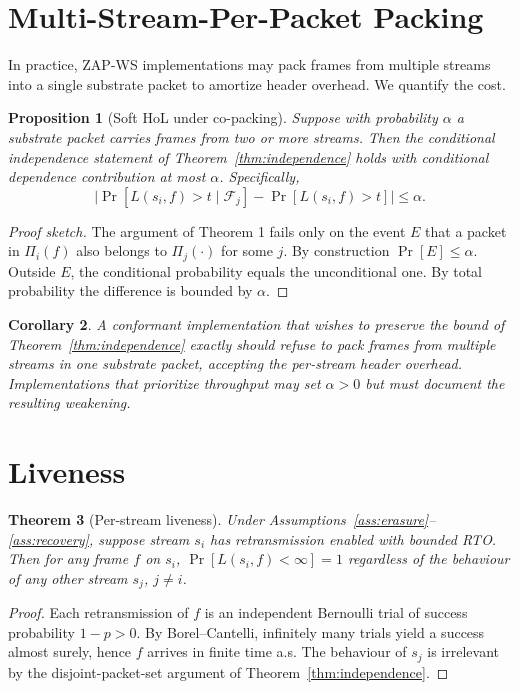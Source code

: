 \documentclass[11pt,a4paper]{article}
\newtheorem{theorem}{Theorem}
\newtheorem{corollary}[theorem]{Corollary}
\newtheorem{proposition}[theorem]{Proposition}
\begin{document}
\section{Multi-Stream-Per-Packet Packing}\label{sec:packing}

In practice, ZAP-WS implementations may pack frames from multiple
streams into a single substrate packet to amortize header overhead. We
quantify the cost.

\begin{proposition}[Soft HoL under co-packing]\label{prop:soft-hol}
Suppose with probability $\alpha$ a substrate packet carries frames from
two or more streams. Then the conditional independence statement of
Theorem~\ref{thm:independence} holds with conditional dependence
contribution at most $\alpha$. Specifically,
\[
\bigl| \Pr[L(s_i, f) > t \mid \mathcal{F}_j]
- \Pr[L(s_i, f) > t] \bigr| \le \alpha.
\]
\end{proposition}

\begin{proof}[Proof sketch]
The argument of Theorem 1 fails only on the event $E$ that a packet in
$\Pi_i(f)$ also belongs to $\Pi_j(\cdot)$ for some $j$. By construction
$\Pr[E] \le \alpha$. Outside $E$, the conditional probability equals
the unconditional one. By total probability the difference is bounded
by $\alpha$.
\end{proof}

\begin{corollary}
A conformant implementation that wishes to preserve the bound of
Theorem~\ref{thm:independence} exactly should refuse to pack frames from
multiple streams in one substrate packet, accepting the per-stream
header overhead. Implementations that prioritize throughput may set
$\alpha > 0$ but must document the resulting weakening.
\end{corollary}

\section{Liveness}

\begin{theorem}[Per-stream liveness]
Under Assumptions~\ref{ass:erasure}--\ref{ass:recovery}, suppose
stream $s_i$ has retransmission enabled with bounded RTO. Then for any
frame $f$ on $s_i$, $\Pr[L(s_i, f) < \infty] = 1$ regardless of the
behaviour of any other stream $s_j$, $j \ne i$.
\end{theorem}

\begin{proof}
Each retransmission of $f$ is an independent Bernoulli trial of success
probability $1-p > 0$. By Borel--Cantelli, infinitely many trials yield
a success almost surely, hence $f$ arrives in finite time a.s. The
behaviour of $s_j$ is irrelevant by the disjoint-packet-set argument of
Theorem~\ref{thm:independence}.
\end{proof}
\end{document}
